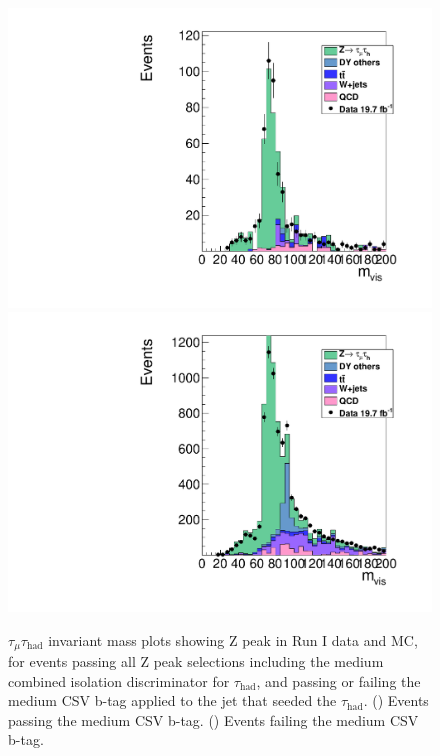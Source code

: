 \begin{figure}[hbtp]
  \begin{center}
    \includegraphics[width=\cmsFigWidth]{figures/PassNN_mvis}
    \includegraphics[width=\cmsFigWidth]{figures/FailNN_mvis}
    \caption{$\tau_{\mu}\tau_{\text{had}}$ invariant mass plots showing Z peak in Run I data and MC, for events passing all Z peak selections including the medium combined isolation discriminator for $\tau_{\text{had}}$, and passing or failing the medium CSV b-tag applied to the jet that seeded the $\tau_{\text{had}}$. (\cmsLeft) Events passing the medium CSV b-tag. (\cmsRight) Events failing the medium CSV b-tag.}
    \label{fig:BTagZPeakPassFail}
  \end{center}
\end{figure}

